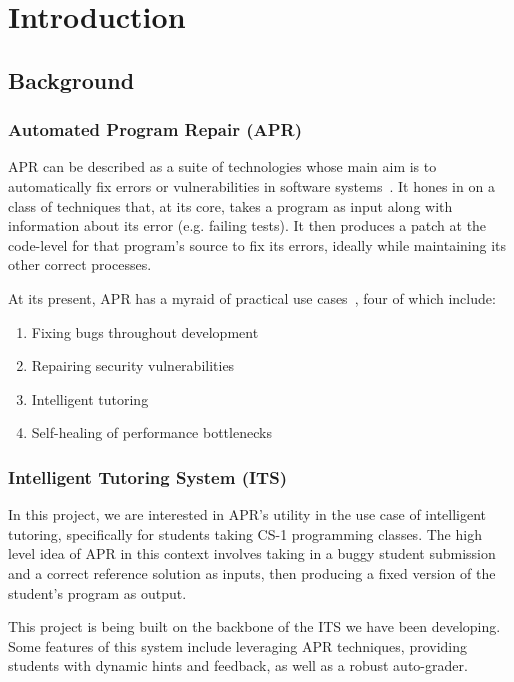 \chapter{Introduction}
\label{introduction}

\section{Background}

\subsection{Automated Program Repair (APR)}

APR can be described as a suite of technologies whose main aim is to automatically
fix errors or vulnerabilities in software systems~\cite{le2021automatic}.
It hones in on a class of techniques that, at its core, takes a program as input
along with information about its error (e.g. failing tests).
It then produces a patch at the code-level for that program's source to fix its
errors, ideally while maintaining its other correct processes.

At its present, APR has a myraid of practical use cases~\cite{goues2019automated},
four of which include:

\begin{enumerate}
    \item Fixing bugs throughout development
    \item Repairing security vulnerabilities
    \item Intelligent tutoring
    \item Self-healing of performance bottlenecks
\end{enumerate}

\subsection{Intelligent Tutoring System (ITS)}

In this project, we are interested in APR's utility in the use case of intelligent tutoring,
specifically for students taking CS-1 programming classes.
The high level idea of APR in this context involves taking in a buggy student submission
and a correct reference solution as inputs, then producing a fixed version of the student's
program as output.

This project is being built on the backbone of the ITS we have been developing.
Some features of this system include leveraging APR techniques, providing students with
dynamic hints and feedback, as well as a robust auto-grader.

